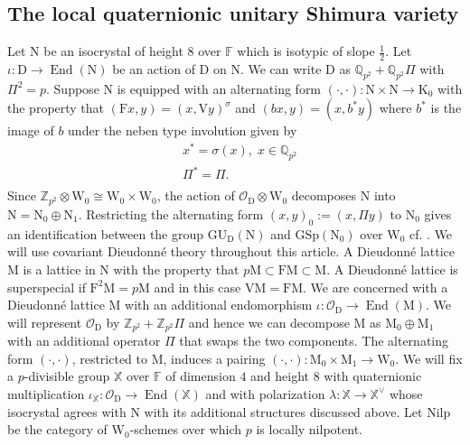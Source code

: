 \documentclass[10pt]{amsart}
\numberwithin{equation}{section}
\theoremstyle{definition}
\def\GSp{\mathrm{GSp}}
\def\GU{\mathrm{GU}}
\def\Nilp{\mathrm{Nilp}}
\DeclareMathOperator{\End}{End}
\def\FF{\mathbb{F}}
\def\QQ{\mathbb{Q}}
\def\XX{\mathbb{X}}
\def\ZZ{\mathbb{Z}}
\def\rmD{\mathrm{D}}
\def\rmF{\mathrm{F}}
\def\rmK{\mathrm{K}}
\def\rmM{\mathrm{M}}
\def\rmN{\mathrm{N}}
\def\rmV{\mathrm{V}}
\def\rmW{\mathrm{W}}
\begin{document}
\subsection{The local quaternionic unitary Shimura variety}
Let $\rmN$ be an isocrystal of height $8$ over $\FF$ which is isotypic of slope $\frac{1}{2}$. Let $\iota: \rmD\rightarrow \End(\rmN)$ be an action of $\rmD$ on $\rmN$. We can write $\rmD$ as $\QQ_{p^{2}}+\QQ_{p^{2}}\Pi$ with $\Pi^{2}=p$. Suppose $\rmN$ is equipped with an alternating form $(\cdot,\cdot): \rmN\times \rmN \rightarrow \rmK_{0}$ with the property that $(\rmF x, y)= (x, \rmV y)^{\sigma}$ and $(bx, y)= (x, b^{*}y)$ where $b^{*}$ is the image of $b$ under the neben type involution given by 
\begin{equation*}
\begin{split}
&x^{*}=\sigma(x),\phantom{.}x\in \QQ_{p^{2}}\\
&\Pi^{*}=\Pi.\\
\end{split}
\end{equation*}
Since $\ZZ_{p^{2}}\otimes\rmW_{0}\cong \rmW_{0}\times\rmW_{0}$, the action of $\mathcal{O}_{\rmD}\otimes\rmW_{0}$ decomposes $\rmN$ into $\rmN=\rmN_{0}\oplus \rmN_{1}$. Restricting the alternating form $(x, y)_{0}:= ( x, \Pi y)$ to $\rmN_{0}$ gives an identification between the group $\GU_{\rmD}(\rmN)$ and $\GSp(\rmN_{0})$
over $\rmW_{0}$ cf. \cite[1.42]{RZ-space}. We will use covariant Dieudonn\'{e} theory throughout this article. A Dieudonn\'{e} lattice $\rmM$ is a lattice in $\rmN$  with the property that $p\rmM \subset \rmF\rmM\subset \rmM$.  A Dieudonn\'{e} lattice is superspecial if $\rmF^{2}\rmM=p\rmM$ and in this case $\rmV\rmM=\rmF\rmM$. We are concerned with a Dieudonn\'{e} lattice $\rmM$ with an additional endomorphism $\iota: \mathcal{O}_{\rmD}\rightarrow \End(\rmM)$. We will represent $\mathcal{O}_{\rmD}$ by $\ZZ_{p^{2}}+\ZZ_{p^{2}}\Pi$ and hence we can decompose M as $\rmM_{0}\oplus \rmM_{1}$ with an additional operator $\Pi$ that swaps the two components. The alternating form $(\cdot,\cdot)$, restricted to $\rmM$, induces a pairing $(\cdot,\cdot): \rmM_{0}\times \rmM_{1}\rightarrow \rmW_{0}$. We will fix a $p$-divisible group $\XX$ over $\FF$ of dimension $4$ and height $8$ with quaternionic multiplication $\iota_{\XX}: \mathcal{O}_{\rmD}\rightarrow \End(\XX)$ and with polarization $\lambda: \XX\rightarrow \XX^{\vee}$ whose isocrystal agrees with $\rmN$ with its additional structures discussed above. Let $\Nilp$ be the category of $\rmW_{0}$-schemes over which $p$ is locally nilpotent.
\end{document}

